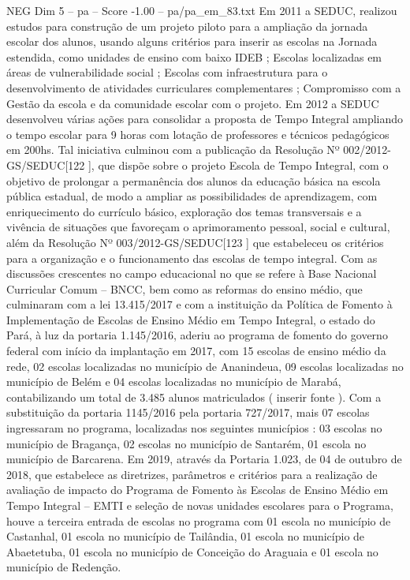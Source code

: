 \begin{textsample}{NEG Dim 5 – pa – Score -1.00 – pa/pa\_em\_83.txt}
Em 2011 a SEDUC, realizou estudos para construção de um projeto piloto para a ampliação da jornada escolar dos alunos, usando alguns critérios para inserir as escolas na Jornada estendida, como unidades de ensino com baixo IDEB ; Escolas localizadas em áreas de vulnerabilidade social ; Escolas com infraestrutura para o desenvolvimento de atividades curriculares complementares ; Compromisso com a Gestão da escola e da comunidade escolar com o projeto.
Em 2012 a SEDUC desenvolveu várias ações para consolidar a proposta de Tempo Integral ampliando o tempo escolar para 9 horas com lotação de professores e técnicos pedagógicos em 200hs.
Tal iniciativa culminou com a publicação da Resolução Nº 002/2012-GS/SEDUC[122 ], que dispõe sobre o projeto Escola de Tempo Integral, com o objetivo de prolongar a permanência dos alunos da educação básica na escola pública estadual, de modo a ampliar as possibilidades de aprendizagem, com enriquecimento do currículo básico, exploração dos temas transversais e a vivência de situações que favoreçam o aprimoramento pessoal, social e cultural, além da Resolução Nº 003/2012-GS/SEDUC[123 ] que estabeleceu os critérios para a organização e o funcionamento das escolas de tempo integral.
Com as discussões crescentes no campo educacional no que se refere à Base Nacional Curricular Comum – BNCC, bem como as reformas do ensino médio, que culminaram com a lei 13.415/2017 e com a instituição da Política de Fomento à Implementação de Escolas de Ensino Médio em Tempo Integral, o estado do Pará, à luz da portaria 1.145/2016, aderiu ao programa de fomento do governo federal com início da implantação em 2017, com 15 escolas de ensino médio da rede, 02 escolas localizadas no município de Ananindeua, 09 escolas localizadas no município de Belém e 04 escolas localizadas no município de Marabá, contabilizando um total de 3.485 alunos matriculados ( inserir fonte ).
Com a substituição da portaria 1145/2016 pela portaria 727/2017, mais 07 escolas ingressaram no programa, localizadas nos seguintes municípios : 03 escolas no município de Bragança, 02 escolas no município de Santarém, 01 escola no município de Barcarena.
Em 2019, através da Portaria 1.023, de 04 de outubro de 2018, que estabelece as diretrizes, parâmetros e critérios para a realização de avaliação de impacto do Programa de Fomento às Escolas de Ensino Médio em Tempo Integral – EMTI e seleção de novas unidades escolares para o Programa, houve a terceira entrada de escolas no programa com 01 escola no município de Castanhal, 01 escola no município de Tailândia, 01 escola no município de Abaetetuba, 01 escola no município de Conceição do Araguaia e 01 escola no município de Redenção.

\end{textsample}
